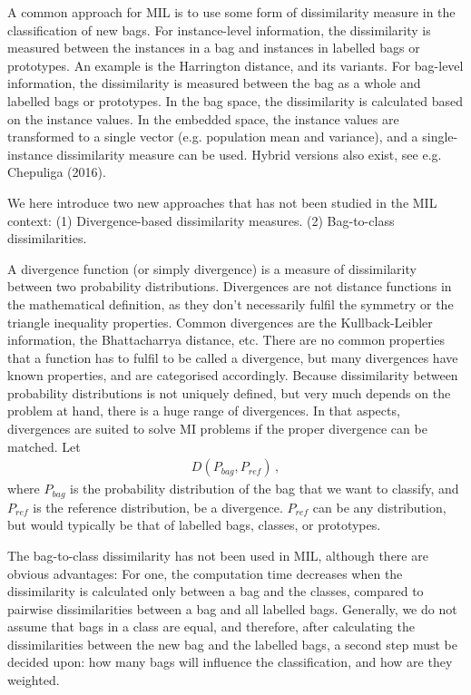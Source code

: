 A common approach for MIL is to use some form of dissimilarity measure in the classification of new bags. 
For instance-level information, the dissimilarity is measured between the instances in a bag and instances in labelled bags or prototypes. 
An example is the Harrington distance, and its variants. 
For bag-level information, the dissimilarity is measured between the bag as a whole and labelled bags or prototypes. 
{\color{red} In the bag space, the dissimilarity is calculated based on the instance values.}
In the embedded space, the instance values are transformed to a single vector (e.g. population mean and variance), and a single-instance dissimilarity measure can be used. 
Hybrid versions also exist, see e.g. {\color{green} Chepuliga (2016)}. 

We here introduce two new approaches that has not been studied in the MIL context: 
(1) Divergence-based dissimilarity measures. 
(2) Bag-to-class dissimilarities. 

A divergence function (or simply divergence) is a measure of dissimilarity between two probability distributions.
Divergences are not distance functions in the mathematical definition, as they don't necessarily fulfil the symmetry or the triangle inequality properties. 
Common divergences are the Kullback-Leibler information, the Bhattacharrya distance, etc. 
There are no common properties that a function has to fulfil to be called a divergence, but many divergences have known properties, and are categorised accordingly. 
Because dissimilarity between probability distributions is not uniquely defined, but very much depends on the problem at hand, there is a huge range of divergences. 
In that aspects, divergences are suited to solve MI problems if the proper divergence can be matched. 
Let 
\begin{align}
  D(P_{bag}, P_{ref})\, ,
\end{align}
where $P_{bag}$ is the probability distribution of the bag that we want to classify, and $P_{ref}$ is the reference distribution, be a divergence. 
$P_{ref}$ can be any distribution, but would typically be that of labelled bags, classes, or prototypes. 

The bag-to-class dissimilarity has not been used in MIL, although there are obvious advantages:
For one, the computation time decreases when the dissimilarity is calculated only between a bag and the classes, compared to pairwise dissimilarities between a bag and all labelled bags. %
Generally, we do not assume that bags in a class are equal, and therefore, after calculating the dissimilarities between the new bag and the labelled bags, a second step must be decided upon: how many bags will influence the classification, and how are they weighted.

